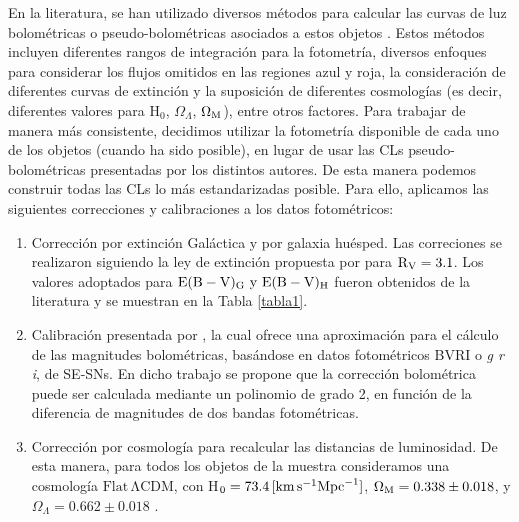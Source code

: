 \documentclass[baaa]{baaa}
\begin{document}
En la literatura, se han utilizado diversos métodos para calcular las curvas de luz bolométricas o pseudo-bolométricas asociados a estos objetos \citep{Deng:2005, Mazzali:2006, Cano:2011, Schulze:2014, DElia:2015, Ashal:2019}. Estos métodos incluyen diferentes rangos de integración para la fotometría, diversos enfoques para considerar los flujos omitidos en las regiones azul y roja, la consideración de diferentes curvas de extinción y la suposición de diferentes cosmologías (es decir, diferentes valores para H$_0$, $\Omega_{\Lambda}$, $\Omega_{\rm{M}}$), entre otros factores. Para trabajar de manera más consistente, decidimos utilizar la fotometría disponible de cada uno de los objetos (cuando ha sido posible), en lugar de usar las CLs pseudo-bolom\'etricas presentadas por los distintos autores. De esta manera podemos construir todas las CLs lo más estandarizadas posible. Para ello, aplicamos las siguientes correcciones y calibraciones a los datos fotom\'etricos:


\begin{enumerate}[label=(\alph*)]
\item Correcci\'on por extinci\'on Gal\'actica y por galaxia hu\'esped. Las correciones se realizaron siguiendo la ley de extinci\'on propuesta por \cite{Cardelli:1989} para  $\rm{R_{V}}=3.1$. Los valores adoptados para $\rm{E(B-V)_G \ y \ E(B-V)_H}$ fueron obtenidos de la literatura y se muestran en la Tabla \ref{tabla1}.
\item Calibraci\'on presentada por \cite{Lyman:2014}, la cual ofrece una aproximaci\'on para el c\'alculo de las magnitudes bolom\'etricas, bas\'andose en datos fotom\'etricos BVRI o \textit{g r i}, de SE-SNs. En dicho trabajo se propone que la correcci\'on bolom\'etrica puede ser calculada mediante un polinomio de grado 2, en funci\'on de la diferencia de magnitudes de dos bandas fotom\'etricas. 
\item Corrección por cosmología para recalcular las distancias de luminosidad. De esta manera, para todos los objetos de la muestra consideramos una cosmología $\mathrm{Flat\,\Lambda CDM}$, con H$_0=73.4 \, [\rm{km}\,\rm{s}^{-1} \rm{Mpc}^{-1}]$, $\rm{\Omega_M= 0.338 \pm 0.018}$, y $\Omega_\Lambda=0.662 \pm 0.018$ \citep{Brout:2022}.
\end{enumerate}
\end{document}
